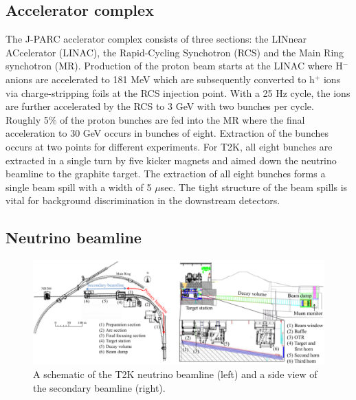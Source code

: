 \subsection{Accelerator complex}
\label{subsec:AcceleratorComplex}
The J-PARC acclerator complex consists of three sections: the LINnear ACcelerator (LINAC), the Rapid-Cycling Synchotron (RCS) and the Main Ring synchotron (MR).  Production of the proton beam starts at the LINAC where H$^-$ anions are accelerated to 181 MeV which are subsequently converted to h$^+$ ions via charge-stripping foils at the RCS injection point.  With a 25 Hz cycle, the ions are further accelerated by the RCS to 3 GeV with two bunches per cycle.  Roughly 5$\%$ of the proton bunches are fed into the MR where the final acceleration to 30 GeV occurs in bunches of eight.  Extraction of the bunches occurs at two points for different experiments.  For T2K, all eight bunches are extracted in a single turn by five kicker magnets and aimed down the neutrino beamline to the graphite target.  The extraction of all eight bunches forms a single beam spill with a width of 5 $\mu$sec.  The tight structure of the beam spills is vital for background discrimination in the downstream detectors.

\subsection{Neutrino beamline}
\label{subsec:NeutrinoBeamline}

\begin{figure}
  \centering
  \includegraphics[width=15cm]{images/t2k/neutrino_beamline.pdf}
  \caption{A schematic of the T2K neutrino beamline (left) and a side view of the secondary beamline (right).}
  \label{fig:NeutrinoBeamline}
\end{figure}


